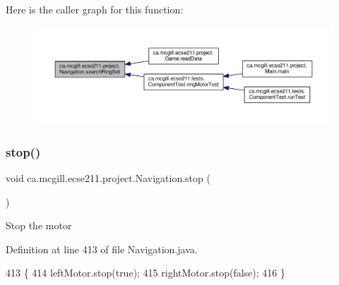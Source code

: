 Here is the caller graph for this function\+:
\nopagebreak
\begin{figure}[H]
\begin{center}
\leavevmode
\includegraphics[width=350pt]{classca_1_1mcgill_1_1ecse211_1_1project_1_1_navigation_a720271c3961b2819183210ad6106beff_icgraph}
\end{center}
\end{figure}
\mbox{\label{classca_1_1mcgill_1_1ecse211_1_1project_1_1_navigation_ae8530d181ffd790ff9dea5eeab54b1a1}} 
\subsubsection{\texorpdfstring{stop()}{stop()}}
{\footnotesize\ttfamily void ca.\+mcgill.\+ecse211.\+project.\+Navigation.\+stop (\begin{DoxyParamCaption}{ }\end{DoxyParamCaption})}

Stop the motor 

Definition at line 413 of file Navigation.\+java.


\begin{DoxyCode}
413                      \{
414     leftMotor.stop(\textcolor{keyword}{true});
415     rightMotor.stop(\textcolor{keyword}{false});
416   \}
\end{DoxyCode}
\mbox{\label{classca_1_1mcgill_1_1ecse211_1_1project_1_1_navigation_ad89b3dd084d81b4ec4d89ea73ba13eaa}} 
